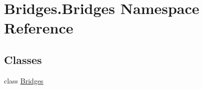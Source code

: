 \hypertarget{namespace_bridges_1_1_bridges}{}\section{Bridges.\+Bridges Namespace Reference}
\label{namespace_bridges_1_1_bridges}
\subsection*{Classes}
\begin{DoxyCompactItemize}
\item 
class \mbox{\hyperlink{class_bridges_1_1_bridges_1_1_bridges}{Bridges}}
\end{DoxyCompactItemize}
